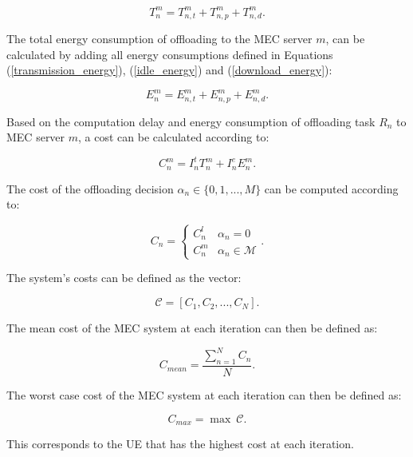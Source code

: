 \begin{equation}
    T_n^m = T_{n,t}^m + T_{n,p}^m + T_{n, d}^m .
\end{equation}

The total energy consumption of offloading to the \acrshort{MEC} server $m$, can be calculated by adding all energy consumptions defined in Equations (\ref{transmission_energy}), (\ref{idle_energy}) and (\ref{download_energy}):

\begin{equation}
    E_n^m = E_{n,t}^m + E_{n,p}^m + E_{n, d}^m .
\end{equation}

Based on the computation delay and energy consumption of offloading task $R_n$ to \acrshort{MEC} server $m$, a cost can be calculated according to:

\begin{equation}
    C_n^m = I_n^t T_n^m + I_n^e E_n^m .
\end{equation}

The cost of the offloading decision $\alpha_n \in \{0, 1, ..., M\}$ can be computed according to:

\begin{equation}
    C_n =
    \begin{cases}
        C_n^l & \alpha_n = 0             \\
        C_n^m & \alpha_n \in \mathcal{M}
    \end{cases} .
\end{equation}

The system's costs can be defined as the vector:

\begin{equation}
    \mathcal{C} = [C_1, C_2, ..., C_N].
\end{equation}


The mean cost of the \acrshort{MEC} system at each iteration can then be defined as:

\begin{equation} \label{C_mean}
    C_{mean} = \frac{\sum\limits_{n=1}^N C_n}{N}.
\end{equation}

The worst case cost of the \acrshort{MEC} system at each iteration can then be defined as:

\begin{equation}
    C_{max} = \max \ \mathcal{C}.
\end{equation}

This corresponds to the \acrshort{UE} that has the highest cost at each iteration.

